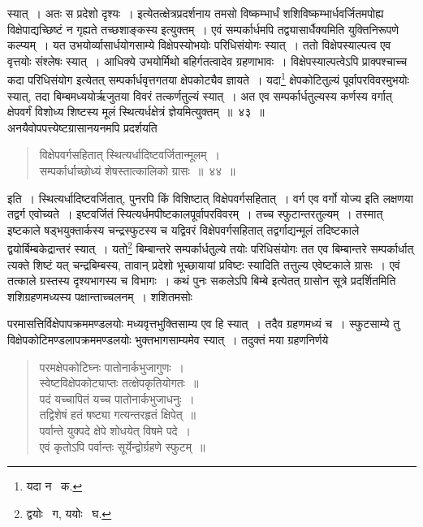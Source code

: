 \documentclass[11pt, openany]{book}
\begin{document}
\newpage

\noindent स्यात्~। अतः स प्रदेशो दृश्यः~। इत्येतत्क्षेत्रप्रदर्शनाय {\qt तमसो विष्कम्भार्धं शशिविष्कम्भार्धवर्जितमपोह्य विक्षेपाद्यच्छिष्टं न गृह्यते तच्छशाङ्कस्य} इत्युक्तम्~। एवं सम्पर्कार्धमपि तद्व्यासार्धैक्यमिति युक्तिनिरूपणे कल्प्यम्~। यत उभयोर्व्यासार्धयोगसाम्ये विक्षेपस्योभयोः परिधिसंयोगः स्यात्~। ततो विक्षेपस्याल्पत्व एव वृत्तयोः संश्लेषः स्यात्~। आधिक्ये उभयोर्मिथो बहिर्गतत्वादेव ग्रहणाभावः~। विक्षेपस्याल्पत्वेऽपि प्राक्पश्चाच्च कदा परिधिसंयोग इत्येतत् सम्पर्कार्धवृत्तगतया क्षेपकोट्यैव ज्ञायते~। यदा\renewcommand{\thefootnote}{१}\footnote{यदा न \textendash\ क.} क्षेपकोटितुल्यं पूर्वापरविवरमुभयोः स्यात्, तदा बिम्बमध्ययोर्ऋजुतया विवरं तत्कर्णतुल्यं स्यात्~। अत एव सम्पर्कार्धतुल्यस्य कर्णस्य वर्गात् क्षेपवर्गं विशोध्य शिष्टस्य मूलं स्थित्यर्धक्षेत्रं ज्ञेयमित्युक्तम्~॥~४३~॥\\
	
\indent अनयैवोपपत्त्येष्टग्रासानयनमपि प्रदर्शयति\textendash 
\begin{quote}
{\ab विक्षेपवर्गसहितात् स्थित्यर्धादिष्टवर्जितान्मूलम्~।\\
	सम्पर्कार्धाच्छोध्यं शेषस्तात्कालिको ग्रासः~॥~४४~॥} 
\end{quote}

\indent इति~। स्थित्यर्धादिष्टवर्जितात्, पुनरपि किं विशिष्टात् विक्षेपवर्गसहितात्~। वर्ग एव वर्गो योज्य इति लक्षणया तद्वर्ग एवोच्यते~।
इष्टवर्जितं स्यित्यर्धमपीष्टकालपूर्वापरविवरम्~। तच्च स्फुटान्तरतुल्यम्~। तस्मात् इष्टकाले षड्भयुक्तार्कस्य चन्द्रस्फुटस्य च यद्विवरं
विक्षेपवर्गसहितात् तद्वर्गाद्यन्मूलं तदिष्टकाले द्वयोर्बिम्बकेद्रान्तरं स्यात्~। यतो\renewcommand{\thefootnote}{२}\footnote{द्वयोः \textendash\ ग, ययोः \textendash\ घ.} बिम्बान्तरे सम्पर्कार्धतुल्ये तयोः परिधिसंयोगः तत एव बिम्बान्तरे सम्पर्कार्धात् त्यक्ते शिष्टं यत् चन्द्रबिम्बस्य, तावान् प्रदेशो भूच्छायायां प्रविष्टः स्यादिति तत्तुल्य एवेष्टकाले ग्रासः~। एवं तत्काले ग्रस्तस्य दृश्यभागस्य च विभागः~। कथं पुनः सकलेऽपि बिम्बे इत्येतत् {\qt ग्रासोन} सूत्रे प्रदर्शितमिति शशिग्रहणमध्यस्य पक्षान्ताच्चलनम्~। शशितमसोः

\newpage

\noindent परमासत्तिर्विक्षेपापक्रममण्डलयोः मध्यवृत्तभुक्तिसाम्य एव हि स्यात्~। तदैव ग्रहणमध्यं च~। स्फुटसाम्ये तु विक्षेपकोटिमण्डलापक्रममण्डलयोः भुक्तभागसाम्यमेव स्यात्~। तदुक्तं मया ग्रहणनिर्णये\textendash  

\begin{quote}
{\qt परमक्षेपकोटिघ्नः पातोनार्कभुजागुणः~। \\
 स्वेष्टविक्षेपकोट्याप्तः तत्क्षेपकृतियोगतः~॥ \\
 पदं यच्चापितं यच्च पातोनार्कभुजाधनुः~। \\
 तद्विशेषं हतं षष्ट्या गत्यन्तरहृतं क्षिपेत्~॥ \\
 पर्वान्ते युक्पदे क्षेपे शोधयेत् विषमे पदे~।\\
 एवं कृतोऽपि पर्वान्तः सूर्येन्द्वोर्ग्रहणे स्फुटम्~॥} 
\end{quote}
 
\end{document}
